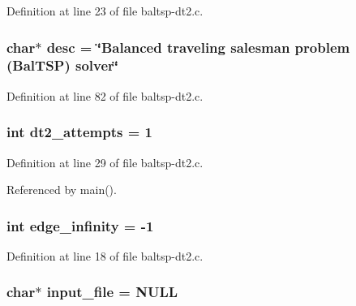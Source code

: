 Definition at line 23 of file baltsp-dt2.c.\hypertarget{bin_2baltsp-dt2_8c_3aad16fd4bea1b9717f232ea75ad6449}{
\subsubsection[{desc}]{\setlength{\rightskip}{0pt plus 5cm}char$\ast$ {\bf desc} = \char`\"{}Balanced traveling salesman problem (BalTSP) solver\char`\"{}}}
\label{bin_2baltsp-dt2_8c_3aad16fd4bea1b9717f232ea75ad6449}




Definition at line 82 of file baltsp-dt2.c.\hypertarget{bin_2baltsp-dt2_8c_d4c3a6197eb631f711a3baf6af37e85c}{
\subsubsection[{dt2\_\-attempts}]{\setlength{\rightskip}{0pt plus 5cm}int {\bf dt2\_\-attempts} = 1}}
\label{bin_2baltsp-dt2_8c_d4c3a6197eb631f711a3baf6af37e85c}




Definition at line 29 of file baltsp-dt2.c.

Referenced by main().\hypertarget{bin_2baltsp-dt2_8c_61a12d5995172f376610cce2f19e5855}{
\subsubsection[{edge\_\-infinity}]{\setlength{\rightskip}{0pt plus 5cm}int {\bf edge\_\-infinity} = -1}}
\label{bin_2baltsp-dt2_8c_61a12d5995172f376610cce2f19e5855}




Definition at line 18 of file baltsp-dt2.c.\hypertarget{bin_2baltsp-dt2_8c_a4f3a15de34c409bdec6ceacf93078ed}{
\subsubsection[{input\_\-file}]{\setlength{\rightskip}{0pt plus 5cm}char$\ast$ {\bf input\_\-file} = NULL}}
\label{bin_2baltsp-dt2_8c_a4f3a15de34c409bdec6ceacf93078ed}




